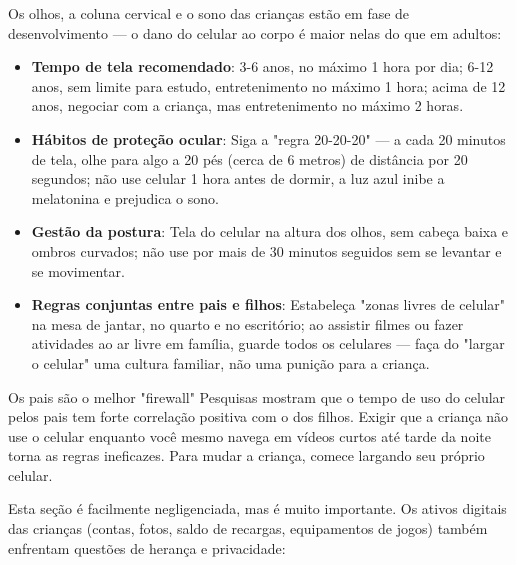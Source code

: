 
Os olhos, a coluna cervical e o sono das crianças estão em fase de desenvolvimento — o dano do celular ao corpo é maior nelas do que em adultos:

\begin{itemize}
  \item \textbf{Tempo de tela recomendado}: 3-6 anos, no máximo 1 hora por dia; 6-12 anos, sem limite para estudo, entretenimento no máximo 1 hora; acima de 12 anos, negociar com a criança, mas entretenimento no máximo 2 horas.
  \item \textbf{Hábitos de proteção ocular}: Siga a "regra 20-20-20" — a cada 20 minutos de tela, olhe para algo a 20 pés (cerca de 6 metros) de distância por 20 segundos; não use celular 1 hora antes de dormir, a luz azul inibe a melatonina e prejudica o sono.
  \item \textbf{Gestão da postura}: Tela do celular na altura dos olhos, sem cabeça baixa e ombros curvados; não use por mais de 30 minutos seguidos sem se levantar e se movimentar.
  \item \textbf{Regras conjuntas entre pais e filhos}: Estabeleça "zonas livres de celular" na mesa de jantar, no quarto e no escritório; ao assistir filmes ou fazer atividades ao ar livre em família, guarde todos os celulares — faça do "largar o celular" uma cultura familiar, não uma punição para a criança.
\end{itemize}

\begin{tcbinfo}{Os pais são o melhor "firewall"}
Pesquisas mostram que o tempo de uso do celular pelos pais tem forte correlação positiva com o dos filhos. Exigir que a criança não use o celular enquanto você mesmo navega em vídeos curtos até tarde da noite torna as regras ineficazes. Para mudar a criança, comece largando seu próprio celular.

\end{tcbinfo}


Esta seção é facilmente negligenciada, mas é muito importante. Os ativos digitais das crianças (contas, fotos, saldo de recargas, equipamentos de jogos) também enfrentam questões de herança e privacidade:

